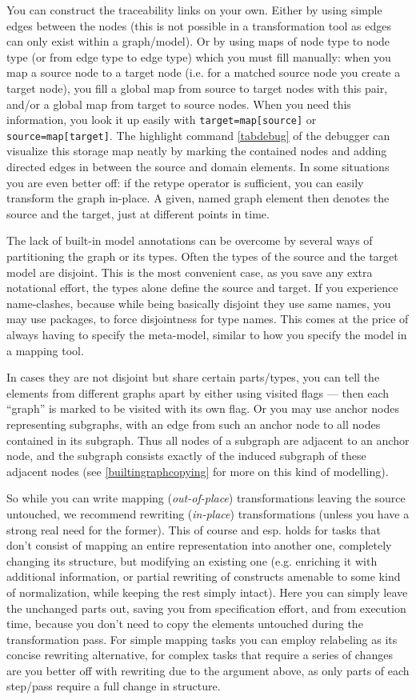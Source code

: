 You can construct the traceability links on your own.
Either by using simple edges between the nodes (this is not possible in a transformation tool as edges can only exist within a graph/model).
Or by using maps of node type to node type (or from edge type to edge type) which you must fill manually:
when you map a source node to a target node (i.e. for a matched source node you create a target node), you fill a global map from source to target nodes with this pair, and/or a global map from target to source nodes.
When you need this information, you look it up easily with \texttt{target=map[source]} or \texttt{source=map[target]}.
The highlight command \ref{tabdebug} of the debugger can visualize this storage map neatly by marking the contained nodes and adding directed edges in between the source and domain elements.
In some situations you are even better off: if the retype operator is sufficient, you can easily transform the graph in-place. A given, named graph element then denotes the source and the target, just at different points in time.

The lack of built-in model annotations can be overcome by several ways of partitioning the graph or its types. 
Often the types of the source and the target model are disjoint.
This is the most convenient case, as you save any extra notational effort, the types alone define the source and target.
If you experience name-clashes, because while being basically disjoint they use same names, 
you may use packages, to force disjointness for type names.
This comes at the price of always having to specify the meta-model, similar to how you specify the model in a mapping tool.

In cases they are not disjoint but share certain parts/types,
you can tell the elements from different graphs apart by either using visited flags --- then each ``graph'' is marked to be visited with its own flag.
Or you may use anchor nodes representing subgraphs, with an edge from such an anchor node to all nodes contained in its subgraph.
Thus all nodes of a subgraph are adjacent to an anchor node, and the subgraph consists exactly of the induced subgraph of these adjacent nodes (see \ref{builtingraphcopying} for more on this kind of modelling).

So while you can write mapping (\emph{out-of-place}) transformations leaving the source untouched, we recommend rewriting (\emph{in-place}) transformations (unless you have a strong real need for the former).
This of course and esp. holds for tasks that don't consist of mapping an entire representation into another one, completely changing its structure, but modifying an existing one (e.g. enriching it with additional information, or partial rewriting of constructs amenable to some kind of normalization, while keeping the rest simply intact).
Here you can simply leave the unchanged parts out, saving you from specification effort, and from execution time, because you don't need to copy the elements untouched during the transformation pass.
For simple mapping tasks you can employ relabeling as its concise rewriting alternative, for complex tasks that require a series of changes are you better off with rewriting due to the argument above, as only parts of each step/pass require a full change in structure.

